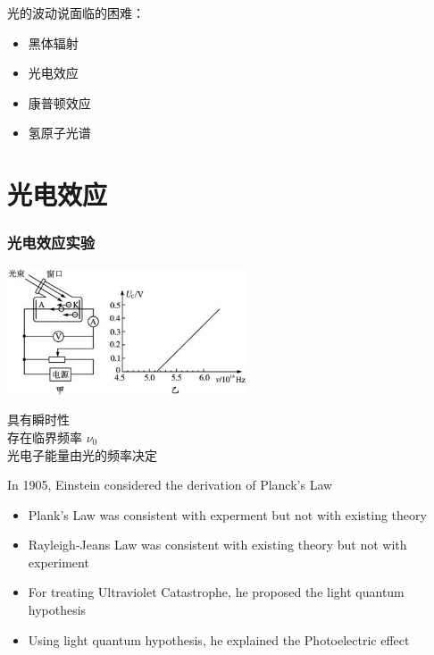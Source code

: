 \begin{frame} 
    光的波动说面临的困难：
    \begin{itemize}
        \item 黑体辐射
        \item 光电效应
        \item 康普顿效应
        \item 氢原子光谱
    \end{itemize}
\end{frame}

\section{光电效应}
\begin{frame} 
    \frametitle{光电效应实验}   
    \begin{center}
       \includegraphics[width=0.53\textwidth]{figs/2021-12-02-16-01-21.png}
   \end{center}  
   \bullet 具有瞬时性 \\
   \bullet 存在临界频率 $\nu_0$ \\
   \bullet 光电子能量由光的频率决定
\end{frame}  

\begin{frame} 
    In 1905, Einstein considered the derivation of Planck's Law  \\
    \begin{itemize}
        \item Plank’s Law was consistent with experment but not with existing theory
        \item Rayleigh-Jeans Law was consistent with existing theory but not with experiment
        \item For treating Ultraviolet Catastrophe, he proposed the light quantum hypothesis
        \item Using light quantum hypothesis, he explained the Photoelectric effect
    \end{itemize}
\end{frame}

